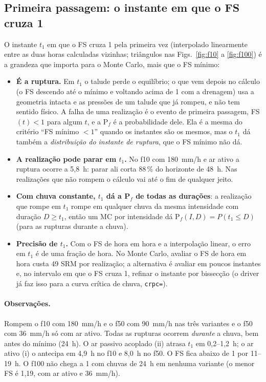 \subsection{Primeira passagem: o instante em que o FS cruza 1}\label{sec:cruza}
O instante $t_1$ em que o FS cruza 1 pela primeira vez (interpolado linearmente entre as duas horas calculadas
vizinhas; triângulos nas Figs.~\ref{fig:f10} a \ref{fig:f100}) é a grandeza que importa para o Monte Carlo, mais que o
FS mínimo:
\begin{itemize}
  \item \textbf{É a ruptura.} Em $t_1$ o talude perde o equilíbrio; o que vem depois no cálculo (o FS descendo até o
    mínimo e voltando acima de 1 com a drenagem) usa a geometria intacta e as pressões de um talude que já rompeu, e
    não tem sentido físico. A falha de uma realização é o evento de primeira passagem, FS$(t) < 1$ para algum $t$, e a
    P$_f$ é a probabilidade dele. Ela é a mesma do critério ``FS mínimo $< 1$'' quando os instantes são os mesmos, mas
    o $t_1$ dá também a \emph{distribuição do instante de ruptura}, que o FS mínimo não dá.
  \item \textbf{A realização pode parar em $t_1$.} No f10 com 180~mm/h e ar ativo a ruptura ocorre a 5,8~h: parar ali
    corta 88\,\% do horizonte de 48~h. Nas realizações que não rompem o cálculo vai até o fim de qualquer jeito.
  \item \textbf{Com chuva constante, $t_1$ dá a P$_f$ de todas as durações}: a realização que rompe em $t_1$ rompe em
    qualquer chuva da mesma intensidade com duração $D \ge t_1$, então um MC por intensidade dá
    P$_f(I, D) = P(t_1 \le D)$ (para as rupturas durante a chuva).
  \item \textbf{Precisão de $t_1$.} Com o FS de hora em hora e a interpolação linear, o erro em $t_1$ é de uma fração de
    hora. No Monte Carlo, avaliar o FS de hora em hora custa 49 SRM por realização; a alternativa é avaliar em poucos
    instantes e, no intervalo em que o FS cruza 1, refinar o instante por bissecção (o driver já faz isso para a curva
    crítica de chuva, \texttt{crpc=}).
\end{itemize}

\begin{table}[H]\centering\scriptsize
\caption{Primeira passagem: $t_1$ (o FS cruza 1 descendo), o instante em que volta a ficar acima de 1 e o tempo
abaixo de 1 (h; interpolação linear entre as horas calculadas).}\label{tab:cruza}
\resizebox{\ifnum\nVar>1 \textwidth\else 0.6\textwidth\fi}{!}{}
\end{table}

\paragraph{Observações.} Rompem o f10 com 180~mm/h e o f50 com 90~mm/h nas três variantes e o f50 com 36~mm/h só com ar
ativo. Todas as rupturas ocorrem \emph{durante} a chuva, bem antes do mínimo (24~h). O ar passivo acoplado (ii) atrasa
$t_1$ em 0,2--1,2~h; o ar ativo (i) o antecipa em 4,9~h no f10 e 8,0~h no f50. O FS fica abaixo de 1 por 11--19~h. O
f100 não chega a 1 com chuvas de 24~h em nenhuma variante (o menor FS é 1,19, com ar ativo e 36~mm/h).
